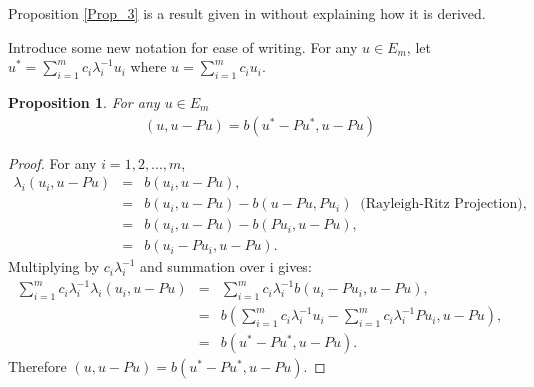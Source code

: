 \documentclass[../../main.tex]{subfiles}
\begin{document}
Proposition \ref{Prop_3} is a result given in \cite{SF73} without explaining how it is derived.

Introduce some new notation for ease of writing. For any $u \in E_{m}$, let $u^{*} = \sum_{i=1}^{m} c_{i}\lambda_{i}^{-1}u_{i}$ where $u = \sum_{i=1}^{m} c_{i}u_{i}$.

\newtheorem{Prop_4}[Prop_1]{Proposition} \label{Prop_4}
\begin{Prop_4}
	For any $u \in E_{m}$
		\begin{eqnarray*}
		( u, u - Pu ) = b(u^{*} - Pu^{*}, u -Pu)
		\end{eqnarray*}
\end{Prop_4}
\begin{proof}
	For any $i = 1,2,...,m$,
	\begin{eqnarray*}
	\lambda_{i}( u_{i},u-Pu ) &=&  b(u_{i}, u-Pu),\\
								&=& b(u_{i}, u-Pu) - b(u-Pu,Pu_{i}) \ \textrm{ (Rayleigh-Ritz Projection)},\\
								&=&  b(u_{i}, u-Pu) - b(Pu_{i},u-Pu),\\
								&=&  b(u_{i}-Pu_{i}, u-Pu).
	\end{eqnarray*}
	Multiplying by $c_{i}\lambda_{i}^{-1}$ and summation over i gives:
	\begin{eqnarray*}
	\sum_{i=1}^{m} c_{i}\lambda_{i}^{-1}\lambda_{i}( u_{i},u-Pu ) &=& \sum_{i=1}^{m} c_{i}\lambda_{i}^{-1}b(u_{i}-Pu_{i}, u-Pu),\\
								&=& b(\sum_{i=1}^{m} c_{i}\lambda_{i}^{-1}u_{i}-\sum_{i=1}^{m} c_{i}\lambda_{i}^{-1}Pu_{i}, u-Pu),\\
										&=& b(u^{*}-Pu^{*}, u-Pu).
	\end{eqnarray*}
	Therefore $( u,u-Pu ) = b(u^{*}-Pu^{*}, u-Pu)$.
\end{proof}
\end{document}
